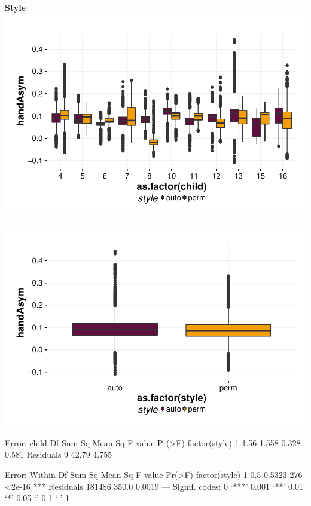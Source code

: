\documentclass{article}
\begin{document}
\textbf{Style}
\includegraphics{features-plot_handAsymmetry_child_style_quiz}

\includegraphics{features-plot_handAsymmetry_style_quiz}

\begin{Schunk}
\begin{Soutput}
Error: child
              Df Sum Sq Mean Sq F value Pr(>F)
factor(style)  1   1.56   1.558   0.328  0.581
Residuals      9  42.79   4.755               

Error: Within
                  Df Sum Sq Mean Sq F value Pr(>F)    
factor(style)      1    0.5  0.5323     276 <2e-16 ***
Residuals     181486  350.0  0.0019                   
---
Signif. codes:  0 ‘***’ 0.001 ‘**’ 0.01 ‘*’ 0.05 ‘.’ 0.1 ‘ ’ 1
\end{Soutput}
\end{Schunk}
\end{document}
